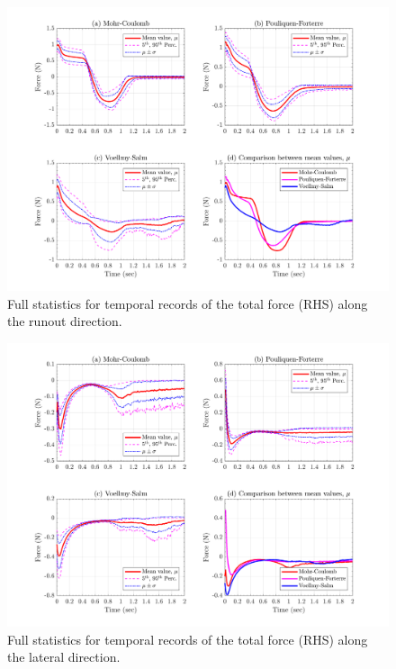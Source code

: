 \documentclass{article}
\begin{document}
\begin{figure}[H]
        \centering
        \includegraphics[width=1\textwidth]{InclinedPlane/GlobalRecords/FRHSx.png}
        \caption{Full statistics for temporal records of the total force (RHS) along the runout direction.}
        \label{fig:Ramp-Ftotalx}
\end{figure}

\begin{figure}[H]
        \centering
        \includegraphics[width=1\textwidth]{InclinedPlane/GlobalRecords/FRHSy.png}
        \caption{Full statistics for temporal records of the total force (RHS) along the lateral direction.}
        \label{fig:Ramp-Ftotaly}
\end{figure}
\end{document}
